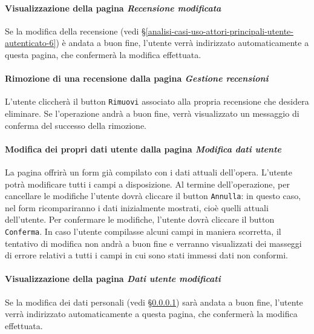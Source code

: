 \paragraph{Visualizzazione della pagina \textit{Recensione modificata}}
\label{analisi-casi-uso-attori-principali-utente-autenticato-8}
Se la modifica della recensione (vedi §\ref{analisi-casi-uso-attori-principali-utente-autenticato-6}) è andata a buon fine, l'utente verrà indirizzato automaticamente a questa pagina, che confermerà la modifica effettuata.


\paragraph{Rimozione di una recensione dalla pagina \textit{Gestione recensioni}}
\label{analisi-casi-uso-attori-principali-utente-autenticato-9}
L'utente cliccherà il button \texttt{Rimuovi} associato alla propria recensione che desidera eliminare. Se l'operazione andrà a buon fine, verrà visualizzato un messaggio di conferma del successo della rimozione.


\paragraph{Modifica dei propri dati utente dalla pagina \textit{Modifica dati utente}}
\label{analisi-casi-uso-attori-principali-utente-autenticato-10}
La pagina offrirà un form già compilato con i dati attuali dell'opera. L'utente potrà modificare tutti i campi a disposizione. Al termine dell'operazione, per cancellare le modifiche l'utente dovrà cliccare il button \texttt{Annulla}: in questo caso, nel form ricompariranno i dati inizialmente mostrati, cioè quelli attuali dell'utente. Per confermare le modifiche, l'utente dovrà cliccare il button \texttt{Conferma}. In caso l'utente compilasse alcuni campi in maniera scorretta, il tentativo di modifica non andrà a buon fine e verranno visualizzati dei masseggi di errore relativi a tutti i campi in cui sono stati immessi dati non conformi.


\paragraph{Visualizzazione della pagina \textit{Dati utente modificati}}
\label{analisi-casi-uso-attori-principali-utente-autenticato-11}
Se la modifica dei dati personali (vedi §\ref{analisi-casi-uso-attori-principali-utente-autenticato-8}) sarà andata a buon fine, l'utente verrà indirizzato automaticamente a questa pagina, che confermerà la modifica effettuata.


